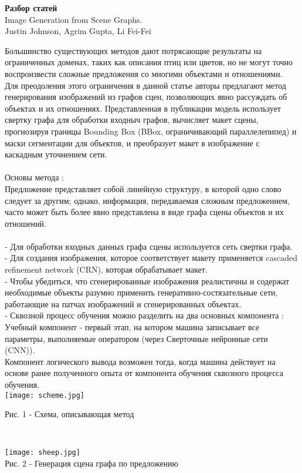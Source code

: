 \documentclass{article}
\begin{document}
    \newpage
    \begin{center} 
    \huge \textbf{Разбор статей} \\[0.5cm]
      \huge Image Generation from Scene Graphs.\\
      Justin Johnson, Agrim Gupta, Li Fei-Fei\\ [1.3cm]
    \end{center} 
      \large Большинство существующих методов дают потрясающие результаты на ограниченных доменах, таких
как описания птиц или цветов, но не могут точно воспроизвести
сложные предложения со многими объектами и отношениями.\\
Для преодоления этого ограничения в данной статье авторы предлагают метод
генерирования изображений из графов сцен, позволяющих явно рассуждать об
объектах и их отношениях. Представленная в публикации модель использует свертку графа для
обработки входныч графов, вычисляет макет сцены, прогнозируя границы
Bounding Box (BBox, ограничивающий параллелепипед) и маски сегментации для объектов, и преобразует макет в
изображение с каскадным уточнением сети.\\ \\
Основы метода :\\
Предложение представляет собой линейную структуру, в которой одно слово следует за другим; однако,
информация, передаваемая сложным предложением, часто может быть более явно представлена в виде графа сцены
объектов и их отношений.\\ \\
 - Для обработки входных данных графа сцены используется сеть свертки графа.\\
 - Для создания изображения, которое соответствует макету применяется cascaded refinement network (CRN), которая
обрабатывает макет.\\
 - Чтобы убедиться, что сгенерированные изображения реалистичны и содержат необходимые объекты разумно применить
генеративно-состязательные сети, работающие на патчах изображений и сгенерированных объектах.\\
 - Сквозной процесс обучения можно разделить на два основных компонента :\\ 
 Учебный компонент - первый этап, на котором машина записывает все параметры, выполняемые оператором (через
 Сверточные нейронные сети (CNN)). \\
  Компонент логического вывода возможен тогда, когда машина действует на основе ранее полученного опыта от компонента обучения сквозного процесса обучения. \\
  \texttt{[image: scheme.jpg]}
  \\
  \begin{center} 
  \caption*{Рис. 1 - Схема, описывающая метод}
  \end{center} 
  \\
  \begin{center} 
  \texttt{[image: sheep.jpg]}
  \\
  \caption*{Рис. 2 - Генерация сцена графа по предложению}
  \end{center} 
\end{document}
